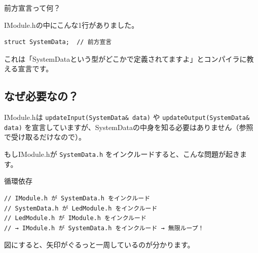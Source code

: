 \begin{qabox}{前方宣言って何？}

IModule.hの中にこんな1行がありました。

\begin{lstlisting}
struct SystemData;  // 前方宣言
\end{lstlisting}

これは「SystemDataという型がどこかで定義されてますよ」とコンパイラに教える宣言です。

\subsection{なぜ必要なの？}

IModule.hは \texttt{updateInput(SystemData\& data)} や \texttt{updateOutput(SystemData\& data)} を宣言していますが、SystemDataの中身を知る必要はありません（参照で受け取るだけなので）。

もしIModule.hが \texttt{SystemData.h} をインクルードすると、こんな問題が起きます。

\begin{badexample}{循環依存}
\begin{lstlisting}
// IModule.h が SystemData.h をインクルード
// SystemData.h が LedModule.h をインクルード
// LedModule.h が IModule.h をインクルード
// → IModule.h が SystemData.h をインクルード → 無限ループ！
\end{lstlisting}
\end{badexample}

図にすると、矢印がぐるっと一周しているのが分かります。

\begin{center}
\end{center}


\end{qabox}
